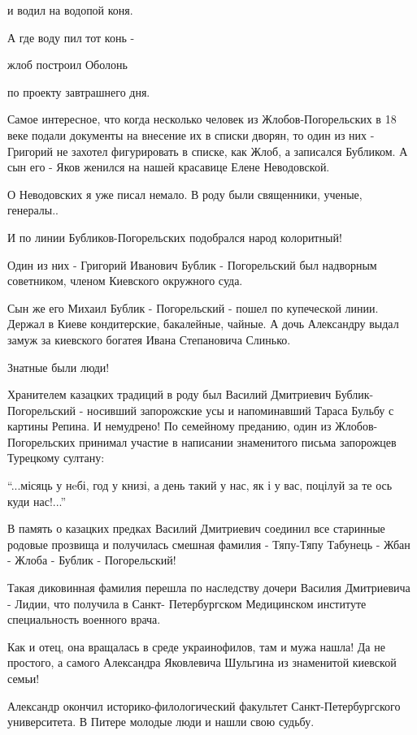 и водил на водопой коня.

А где воду пил тот конь -

жлоб построил Оболонь

по проекту завтрашнего дня.

Самое интересное, что когда несколько человек из Жлобов\hyp Погорельских в 18
веке подали документы на внесение их в списки дворян, то один из них - Григорий
не захотел фигурировать в списке, как Жлоб, а записался Бубликом. А сын его -
Яков женился на нашей красавице Елене Неводовской. 

О Неводовских я уже писал немало. В роду были священники, ученые, генералы.. 

И по линии Бубликов-Погорельских подобрался народ колоритный!

Один из них - Григорий Иванович Бублик - Погорельский был надворным советником,
членом Киевского окружного суда.

Сын же его Михаил Бублик - Погорельский - пошел по купеческой линии. Держал в
Киеве кондитерские, бакалейные, чайные. А дочь Александру выдал замуж за
киевского богатея Ивана Степановича Слинько.

Знатные были люди!


Хранителем казацких традиций в роду был Василий Дмитриевич Бублик-Погорельский
- носивший запорожские усы и напоминавший Тараса Бульбу с картины Репина. И
немудрено! По семейному преданию, один из Жлобов-Погорельских принимал участие
в написании знаменитого письма запорожцев Турецкому султану:

\enquote{...місяць у нeбі, год у книзі, а день такий у нас, як і у вас, поцілуй за те
ось куди нас!...}

В память о казацких предках Василий Дмитриевич соединил все старинные родовые
прозвища и получилась смешная фамилия - Тяпу-Тяпу Табунець - Жбан - Жлоба -
Бублик - Погорельский!


Такая диковинная фамилия перешла по наследству дочери Василия Дмитриевича -
Лидии, что получила в Санкт- Петербургском Медицинском институте специальность
военного врача.

Как и отец, она вращалась в среде украинофилов, там и мужа нашла! Да не
простого, а самого Александра Яковлевича Шульгина из знаменитой киевской семьи! 

Александр окончил  историко-филологический факультет Санкт-Петербургского
университета. В Питере молодые люди и нашли свою судьбу.

